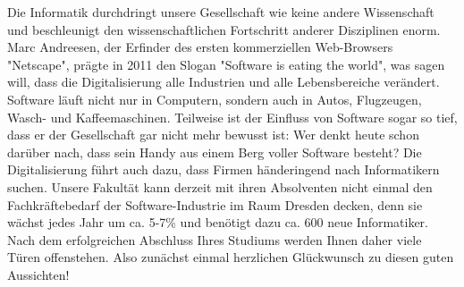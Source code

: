 Die Informatik durchdringt unsere Gesellschaft wie keine andere Wissenschaft und beschleunigt den wissenschaftlichen Fortschritt anderer Disziplinen enorm. Marc Andreesen, der Erfinder des ersten kommerziellen Web-Browsers "Netscape", prägte in 2011 den Slogan "Software is eating the world", was sagen will, dass die Digitalisierung alle Industrien und alle Lebensbereiche verändert. Software läuft nicht nur in Computern, sondern auch in Autos, Flugzeugen, Wasch- und Kaffeemaschinen. Teilweise ist der Einfluss von Software sogar so tief, dass er der Gesellschaft gar nicht mehr bewusst ist: Wer denkt heute schon darüber nach, dass sein Handy aus einem Berg voller Software besteht? Die Digitalisierung führt auch dazu, dass Firmen händeringend nach Informatikern suchen. Unsere Fakultät kann derzeit mit ihren Absolventen nicht einmal den Fachkräftebedarf der Software-Industrie im Raum Dresden decken, denn sie wächst jedes Jahr um ca. 5-7\% und benötigt dazu ca. 600 neue Informatiker. Nach dem erfolgreichen Abschluss Ihres Studiums werden Ihnen daher viele Türen offenstehen. Also zunächst einmal herzlichen Glückwunsch zu diesen guten Aussichten!


